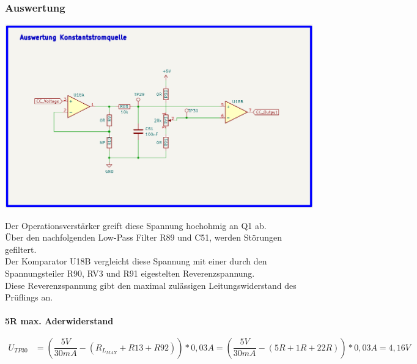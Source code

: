 \newpage
\subsubsection{Auswertung}
\begin{center}
\includegraphics[width=15cm]{Bilder/Auswertung.png}
\end{center}

Der Operationsverstärker greift diese Spannung hochohmig an Q1 ab. 
\\
Über den nachfolgenden Low-Pass Filter R89 und C51, werden Störungen gefiltert.
\\
Der Komparator U18B vergleicht diese Spannung mit einer durch den Spannungsteiler R90, RV3 und R91 eigestelten Reverenzspannung. 
\\
Diese Reverenzspannung gibt den maximal zulässigen Leitungswiderstand des Prüflings an. 
\\
\\
\textbf{5R max. Aderwiderstand}
\\
\begin{center}
\begin{align}
	U_{TP30} &= (\dfrac{5V}{30mA} - (R_{L_{MAX}} + R13 + R92)) * 0,03A = (\dfrac{5V}{30mA} - (5R + 1R + 22R)) * 0,03A = 4,16V
\end{align}
\end{center}

\newpage
